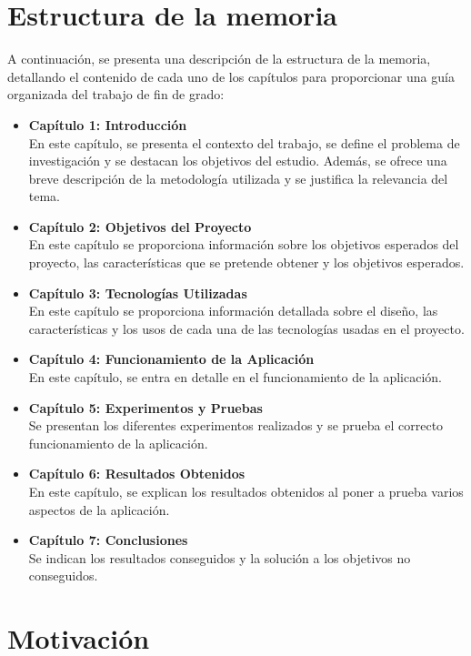 \documentclass[a4paper, 12pt]{book}
\begin{document}
\section{Estructura de la memoria}
\label{sec:seccion}

A continuación, se presenta una descripción de la estructura de la memoria, detallando el contenido de cada uno de los capítulos para 
proporcionar una guía organizada del trabajo de fin de grado:

\begin{itemize}
  \item \textbf{Capítulo 1: Introducción} \\
  En este capítulo, se presenta el contexto del trabajo, se define el problema de investigación y se destacan los objetivos del estudio. Además, se ofrece una breve descripción de la metodología utilizada y se justifica la relevancia del tema.
  \item \textbf{Capítulo 2: Objetivos del Proyecto} \\
  En este capítulo se proporciona información sobre los objetivos esperados del proyecto, las características que se pretende obtener y los objetivos esperados.  
  \item \textbf{Capítulo 3: Tecnologías Utilizadas} \\
  En este capítulo se proporciona información detallada sobre el diseño, las características y los usos de cada una de las tecnologías usadas en el proyecto.
  \item \textbf{Capítulo 4: Funcionamiento de la Aplicación} \\
  En este capítulo, se entra en detalle en el funcionamiento de la aplicación.
  \item \textbf{Capítulo 5: Experimentos y Pruebas} \\
  Se presentan los diferentes experimentos realizados y se prueba el correcto funcionamiento de la aplicación.
  \item \textbf{Capítulo 6: Resultados Obtenidos} \\
  En este capítulo, se explican los resultados obtenidos al poner a prueba varios aspectos de la aplicación.
  \item \textbf{Capítulo 7: Conclusiones} \\
  Se indican los resultados conseguidos y la solución a los objetivos no conseguidos.
\end{itemize}

\section{Motivación}
\label{sec:seccion}
\end{document}
